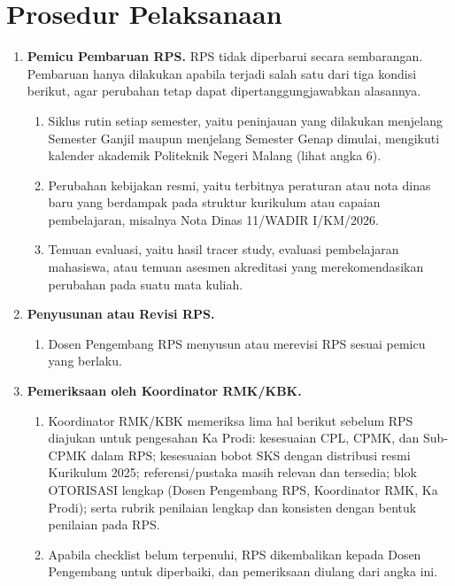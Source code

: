 \documentclass[12pt,a4paper]{report}
\begin{document}
\section{Prosedur Pelaksanaan}

\begin{enumerate}
\item \textbf{Pemicu Pembaruan RPS.} RPS tidak diperbarui secara sembarangan. Pembaruan hanya dilakukan apabila terjadi salah satu dari tiga kondisi berikut, agar perubahan tetap dapat dipertanggungjawabkan alasannya.
  \begin{enumerate}
  \item Siklus rutin setiap semester, yaitu peninjauan yang dilakukan menjelang Semester Ganjil maupun menjelang Semester Genap dimulai, mengikuti kalender akademik Politeknik Negeri Malang (lihat angka 6).
  \item Perubahan kebijakan resmi, yaitu terbitnya peraturan atau nota dinas baru yang berdampak pada struktur kurikulum atau capaian pembelajaran, misalnya Nota Dinas 11/WADIR I/KM/2026.
  \item Temuan evaluasi, yaitu hasil tracer study, evaluasi pembelajaran mahasiswa, atau temuan asesmen akreditasi yang merekomendasikan perubahan pada suatu mata kuliah.
  \end{enumerate}

\item \textbf{Penyusunan atau Revisi RPS.}
  \begin{enumerate}
  \item Dosen Pengembang RPS menyusun atau merevisi RPS sesuai pemicu yang berlaku.
  \end{enumerate}

\item \textbf{Pemeriksaan oleh Koordinator RMK/KBK.}
  \begin{enumerate}
  \item Koordinator RMK/KBK memeriksa lima hal berikut sebelum RPS diajukan untuk pengesahan Ka Prodi: kesesuaian CPL, CPMK, dan Sub-CPMK dalam RPS; kesesuaian bobot SKS dengan distribusi resmi Kurikulum 2025; referensi/pustaka masih relevan dan tersedia; blok OTORISASI lengkap (Dosen Pengembang RPS, Koordinator RMK, Ka Prodi); serta rubrik penilaian lengkap dan konsisten dengan bentuk penilaian pada RPS.
  \item Apabila checklist belum terpenuhi, RPS dikembalikan kepada Dosen Pengembang untuk diperbaiki, dan pemeriksaan diulang dari angka ini.
  \end{enumerate}


\end{enumerate}
\end{document}
